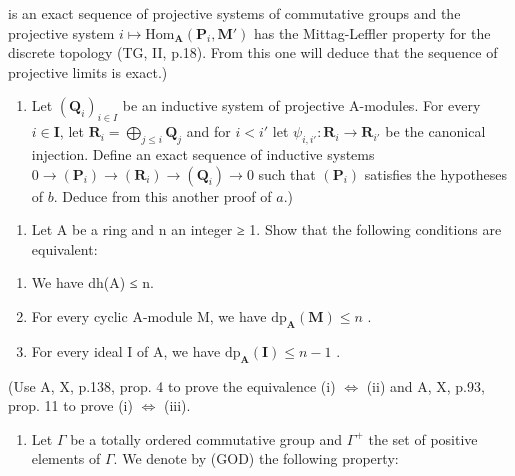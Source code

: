 is an exact sequence of projective systems of commutative groups and the projective system \(i \mapsto \mathrm{Hom}_{\mathbf{A}}(\mathbf{P}_{i}, \mathbf{M}')\) has the Mittag-Leffler property for the discrete topology (TG, II, p.18). From this one will deduce that the sequence of projective limits is exact.)

\begin{enumerate}
\def\labelenumi{\alph{enumi})}
\setcounter{enumi}{2}
\tightlist
\item
  Let \((\mathbf{Q}_i)_{i\in I}\) be an inductive system of projective A-modules. For every \(i\in \mathbf{I}\), let \(\mathbf{R}_i = \bigoplus_{j\leqslant i}\mathbf{Q}_j\) and for \(i < i'\) let \(\psi_{i,i'}: \mathbf{R}_i \to \mathbf{R}_{i'}\) be the canonical injection. Define an exact sequence of inductive systems \(0 \to (\mathbf{P}_i) \to (\mathbf{R}_i) \to (\mathbf{Q}_i) \to 0\) such that \((\mathbf{P}_i)\) satisfies the hypotheses of \(b\). Deduce from this another proof of \(a\).)
\end{enumerate}

\begin{enumerate}
\def\labelenumi{\arabic{enumi})}
\setcounter{enumi}{7}
\tightlist
\item
  Let A be a ring and n an integer ≥ 1. Show that the following conditions are equivalent:
\end{enumerate}

\begin{enumerate}
\def\labelenumi{(\roman{enumi})}
\item
  We have dh(A) ≤ n.
\item
  For every cyclic A-module M, we have \(\mathrm{dp}_{\mathbf{A}}(\mathbf{M}) \leqslant n\) .
\item
  For every ideal I of A, we have \(\mathrm{dp}_{\mathbf{A}}(\mathbf{I}) \leqslant n - 1\) .
\end{enumerate}

(Use A, X, p.138, prop. 4 to prove the equivalence (i) \(\Leftrightarrow\) (ii) and A, X, p.93, prop. 11 to prove (i) \(\Leftrightarrow\) (iii).

\begin{enumerate}
\def\labelenumi{\arabic{enumi})}
\setcounter{enumi}{8}
\tightlist
\item
  Let \(\Gamma\) be a totally ordered commutative group and \(\Gamma^{+}\) the set of positive elements of \(\Gamma\). We denote by (GOD) the following property:
\end{enumerate}

